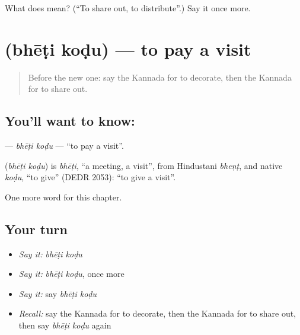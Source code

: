 \begin{tcolorbox}[breakable,colback=teal!4,colframe=teal!35!black,title={Before you move on}]
What does  mean? (\textquotedblleft{}To share out, to distribute\textquotedblright{}.) Say it once more.
\end{tcolorbox}
\section[\texorpdfstring{\kn{ಭೇಟಿ} \kn{ಕೊಡು} (bhēṭi koḍu)}{ಭೇಟಿ ಕೊಡು (bhēṭi koḍu)}]{  (bhēṭi koḍu) — to pay a visit}

\label{lesson:KA-C239-bheti-kodu}



\begin{quote}
Before the new one: say the Kannada for to decorate, then the Kannada for to share out.
\end{quote}

\subsection*{You'll want to know:  }
\textbf{ } — \emph{bhēṭi koḍu} — \textquotedblleft{}to pay a visit\textquotedblright{}.

\begin{cousinweb}
\textbf{ } (\emph{bhēṭi koḍu}) is \emph{bhēṭi}, \textquotedblleft{}a meeting, a visit\textquotedblright{}, from Hindustani \emph{bheṇṭ}, and native \emph{koḍu}, \textquotedblleft{}to give\textquotedblright{} (DEDR 2053): \textquotedblleft{}to give a visit\textquotedblright{}.
\end{cousinweb}

\begin{grammarlens}[title={What you've built}]
One more word for this chapter.
\end{grammarlens}

\subsection*{Your turn}
\begin{itemize}
\raggedright
  \item \emph{Say it:} \emph{bhēṭi koḍu}
  \item \emph{Say it:} \emph{bhēṭi koḍu}, once more
  \item \emph{Say it:} say \emph{bhēṭi koḍu}
  \item \emph{Recall:} say the Kannada for to decorate, then the Kannada for to share out, then say \emph{bhēṭi koḍu} again
\end{itemize}

